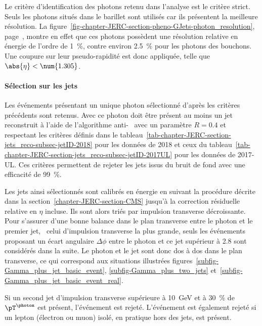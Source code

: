 \par Le critère d'identification des photons retenu dans l'analyse est le critère strict.
Seuls les photons situés dans le barillet sont utilisés car ils présentent la meilleure résolution.
La figure~\ref{fig-chapter-JERC-section-pheno-GJets-photon_resolution}, page~\pageref{fig-chapter-JERC-section-pheno-GJets-photon_resolution}, montre en effet que ces photons possèdent une résolution relative en énergie de l'ordre de \SI{1}{\%}, contre environ \SI{2.5}{\%} pour les photons des bouchons.
Une coupure sur leur pseudo-rapidité est donc appliquée, telle que $\abs{\eta} < \num{1.305}$.
\par {}
\paragraph{Sélection sur les jets}
Les événements présentant un unique photon sélectionné d'après les critères précédents sont retenus.
Avec ce photon doit être présent au moins un jet reconstruit à l'aide de l'algorithme anti-\kT~\cite{Cacciari_antikT} avec un paramètre $R=\num{0.4}$ et respectant les critères définis dans le tableau~\ref{tab-chapter-JERC-section-jets_reco-subsec-jetID-2018} pour les données de 2018 et ceux du tableau~\ref{tab-chapter-JERC-section-jets_reco-subsec-jetID-2017UL} pour les données de 2017-UL.
Ces critères permettent de rejeter les jets issus du bruit de fond avec une efficacité de \SI{99}{\%}.
\par Les jets ainsi sélectionnés sont calibrés en énergie en suivant la procédure décrite dans la section~\ref{chapter-JERC-section-CMS} jusqu'à la correction résiduelle relative en $\eta$ incluse. Ils sont alors triés par impulsion transverse décroissante.
Pour s'assurer d'une bonne balance dans le plan transverse entre le photon et le premier jet, \ie\ celui d'impulsion transverse la plus grande, seuls les événements proposant un écart angulaire $\Delta\phi$ entre le photon et ce jet supérieur à \SI{2.8}{\rad} sont considérés dans la suite.
Le photon et le jet sont donc dos à dos dans le plan transverse, ce qui correspond aux situations illustrées figures~\ref{subfig-Gamma_plus_jet_basic_event}, \ref{subfig-Gamma_plus_two_jets} et~\ref{subfig-Gamma_plus_jet_basic_event_real}.
\par Si un second jet d'impulsion transverse supérieure à \SI{10}{\GeV} et à \SI{30}{\%} de $\pT^{\photon}$ est présent, l'événement est rejeté.
L'événement est également rejeté si un lepton (électron ou muon) isolé, en pratique hors des jets, est présent.
